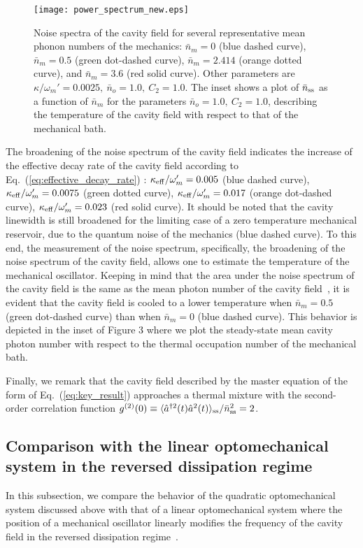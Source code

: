 \documentclass[pra,aps,showpacs,twocolumn,floatfix, superscriptaddress, nofootinbib, nobibnotes]{revtex4-1}
\begin{document}
\begin{figure}[]
\texttt{[image: power\_spectrum\_new.eps]}

\caption{Noise spectra of the cavity field for several representative mean phonon numbers of the mechanics: ${\bar n}_m=0$ (blue dashed curve), ${\bar n}_m=0.5$ (green dot-dashed curve), ${\bar n}_m=2.414$ (orange dotted curve), and ${\bar n}_m=3.6$ (red solid curve). Other parameters are $\kappa/\omega_m'=0.0025,~\bar n_o=1.0,~C_2=1.0$. The inset shows a plot of ${\bar n}_{\rm ss}$ as a function of ${\bar n}_m$ for the parameters $\bar n_o=1.0,~C_2=1.0$, describing the temperature of the cavity field with respect to that of the mechanical bath.}
\label{fig:Noise_spectrum_quadratic}
\end{figure}
    
The broadening of the noise spectrum of the cavity field indicates the increase of the effective decay rate of the cavity field according to Eq.~(\ref{eq:effective_decay_rate}) : $\kappa_{\rm eff}/\omega_m' = 0.005$ (blue dashed curve), $\kappa_{\rm eff}/\omega_m' = 0.0075$ (green dotted curve), $\kappa_{\rm eff}/\omega_m' = 0.017$ (orange dot-dashed curve), $\kappa_{\rm eff}/\omega_m' = 0.023$ (red solid curve). It should be noted that the cavity linewidth is still broadened for the limiting case of a zero temperature mechanical reservoir, due to the quantum noise of the mechanics (blue dashed curve). To this end, the measurement of the noise spectrum, specifically, the broadening of the noise spectrum of the cavity field, allows one to estimate the temperature of the mechanical oscillator. Keeping in mind that the area under the noise spectrum of the cavity field is the same as the mean photon number of the cavity field~\cite{Pierre_book}, it is evident that the cavity field is cooled to a lower temperature when $\bar n_m=0.5$ (green dot-dashed curve) than when $\bar n_m=0$ (blue dashed curve). This behavior is depicted in the inset of Figure 3 where we plot the steady-state mean cavity photon number with respect to the thermal occupation number of the mechanical bath.
    
Finally, we remark that the cavity field described by the master equation of the form of Eq.~(\ref{eq:key_result}) approaches a thermal mixture with the second-order correlation function $g^{(2)}(0)\equiv\langle \hat a ^{\dag 2}(t)\hat a^2(t)\rangle_{\rm ss}/{\bar n}_{\rm ss}^2=2$.  


\subsection{Comparison with the linear optomechanical system in the reversed dissipation regime}
In this subsection, we compare the behavior of the quadratic optomechanical system discussed above with that of a linear optomechanical system where the position of a mechanical oscillator linearly modifies the frequency of the cavity field in the reversed dissipation regime~\cite{PhysRevLett.113.023604, Toth:2017aa}. 
\end{document}

